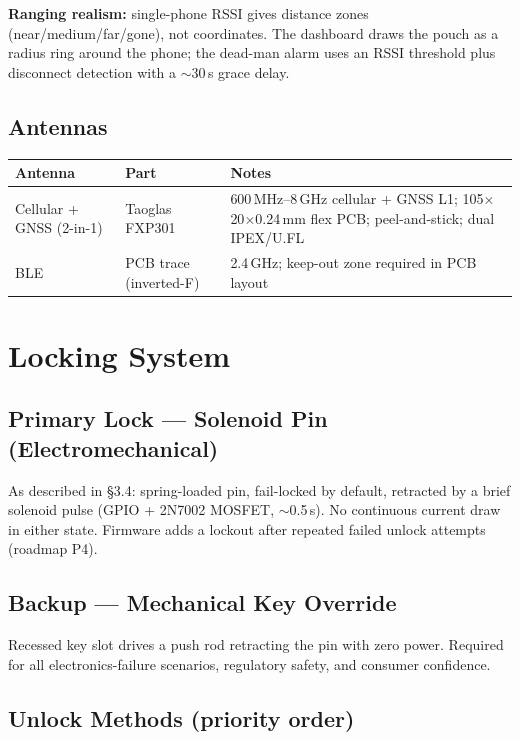 \documentclass[11pt,a4paper]{article}
\begin{document}
\textbf{Ranging realism:} single-phone RSSI gives distance zones (near/medium/far/gone), not coordinates. The dashboard draws the pouch as a radius ring around the phone; the dead-man alarm uses an RSSI threshold plus disconnect detection with a $\sim$30\,s grace delay.

\subsection{Antennas}

\begin{table}[h]
\small
\begin{tabularx}{\textwidth}{llL}
\toprule
\textbf{Antenna} & \textbf{Part} & \textbf{Notes}\\
\midrule
Cellular + GNSS (2-in-1) & Taoglas FXP301 & 600\,MHz--8\,GHz cellular + GNSS L1; 105$\times$20$\times$0.24\,mm flex PCB; peel-and-stick; dual IPEX/U.FL\\
BLE & PCB trace (inverted-F) & 2.4\,GHz; keep-out zone required in PCB layout\\
\bottomrule
\end{tabularx}
\end{table}

\section{Locking System}

\subsection{Primary Lock --- Solenoid Pin (Electromechanical)}

As described in \S3.4: spring-loaded pin, fail-locked by default, retracted by a brief solenoid pulse (GPIO + 2N7002 MOSFET, $\sim$0.5\,s). No continuous current draw in either state. Firmware adds a lockout after repeated failed unlock attempts (roadmap P4).

\subsection{Backup --- Mechanical Key Override}

Recessed key slot drives a push rod retracting the pin with zero power. Required for all electronics-failure scenarios, regulatory safety, and consumer confidence.

\subsection{Unlock Methods (priority order)}
\end{document}
